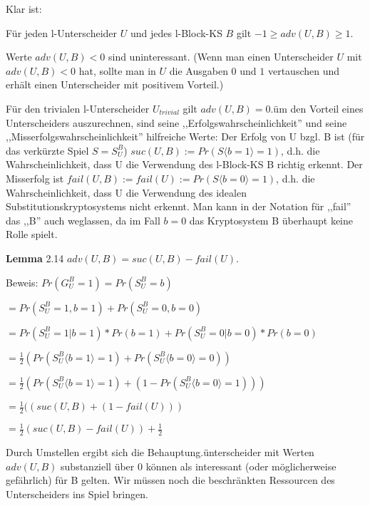 \documentclass[a4paper]{article}
\begin{document}
\begin{multicols}{3}
    Klar ist:
    \begin{itemize*}
        \item Für jeden l-Unterscheider $U$ und jedes l-Block-KS $B$ gilt $-1\geq adv(U,B)\geq 1$.
        \item Werte $adv(U,B)<0$ sind uninteressant. (Wenn man einen Unterscheider $U$ mit $adv(U,B)<0$ hat, sollte man in $U$ die Ausgaben $0$ und $1$ vertauschen und erhält einen Unterscheider mit positivem Vorteil.)
        \item Für den trivialen l-Unterscheider $U_{trivial}$ gilt $adv(U,B) = 0$.üm den Vorteil eines Unterscheiders auszurechnen, sind seine ,,Erfolgswahrscheinlichkeit'' und seine ,,Misserfolgswahrscheinlichkeit'' hilfreiche Werte: Der Erfolg von U bzgl. B ist (für das verkürzte Spiel $S=S_U^B$) $suc(U,B) := Pr(S\langle b= 1\rangle = 1)$, d.h. die Wahrscheinlichkeit, dass U die Verwendung des l-Block-KS B richtig erkennt. Der Misserfolg ist $fail(U,B) := fail(U) := Pr(S\langle b= 0\rangle = 1)$, d.h. die Wahrscheinlichkeit, dass U die Verwendung des idealen Substitutionskryptosystems nicht erkennt. Man kann in der Notation für ,,fail'' das ,,B'' auch weglassen, da im Fall $b=0$ das Kryptosystem B überhaupt keine Rolle spielt.
    \end{itemize*}

    \textbf{Lemma} 2.14 $adv(U,B) = suc(U,B)-fail(U)$.

    Beweis: $Pr(G^B_U= 1) = Pr(S_U^B=b)$
    \begin{itemize*}
        \item $= Pr(S_U^B= 1,b= 1) + Pr(S_U^B= 0,b= 0)$
        \item $= Pr(S_U^B= 1|b= 1)* Pr(b= 1) + Pr(S^B_U= 0|b= 0)*Pr(b= 0)$
        \item $=\frac{1}{2}( Pr(S_U^B\langle b= 1\rangle = 1) + Pr(S_U^B\langle b= 0\rangle = 0))$
        \item $=\frac{1}{2}( Pr(S_U^B\langle b= 1\rangle = 1) + (1-Pr(S_U^B\langle b= 0\rangle = 1)))$
        \item $=\frac{1}{2}( (suc(U,B) + (1-fail(U)))$
        \item $=\frac{1}{2}(suc(U,B)-fail(U)) + \frac{1}{2}$
    \end{itemize*}

    Durch Umstellen ergibt sich die Behauptung.ünterscheider mit Werten $adv(U,B)$ substanziell über 0 können als interessant (oder möglicherweise gefährlich) für B gelten. Wir müssen noch die beschränkten Ressourcen des Unterscheiders ins Spiel bringen.


\end{multicols}
\end{document}
